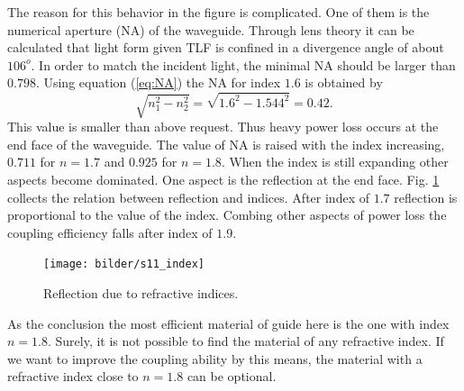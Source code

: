 The reason for this behavior in the figure is complicated. One of them is the numerical aperture (NA) of the waveguide.  Through lens theory it can be calculated that light form given TLF is confined in a divergence angle of about $106^{o}$. In order to match the incident light, the minimal NA should be larger than $0.798$. Using equation (\ref{eq:NA}) the NA for index $1.6$ is obtained by
\begin{equation*}
\sqrt{n_{1}^2-n_{2}^2}=\sqrt{1.6^2-1.544^2}=0.42.
\end{equation*}
This value is smaller than above request. Thus heavy power loss occurs at the end face of the waveguide. The value of NA is raised with the index increasing, $0.711$ for $n=1.7$ and $0.925$ for $n=1.8$.  When the index is still expanding other aspects become dominated. One aspect is the reflection at the end face. Fig. \ref{fig:s11_index} collects the relation between reflection and indices. After index of $1.7$ reflection is proportional to the value of the index. Combing other aspects of power loss the coupling efficiency falls after index of $1.9$.\\
  
\begin{figure}[!ht]
\centering
\texttt{[image: bilder/s11\_index]}
\caption{Reflection due to refractive indices.}
\label{fig:s11_index}
\end{figure}

As the conclusion the most efficient material of guide here is the one with index $n=1.8$.  Surely, it is not possible to find the material of any refractive index. If we want to improve the coupling ability by this means, the material with a refractive index close to $n=1.8$ can be optional.
